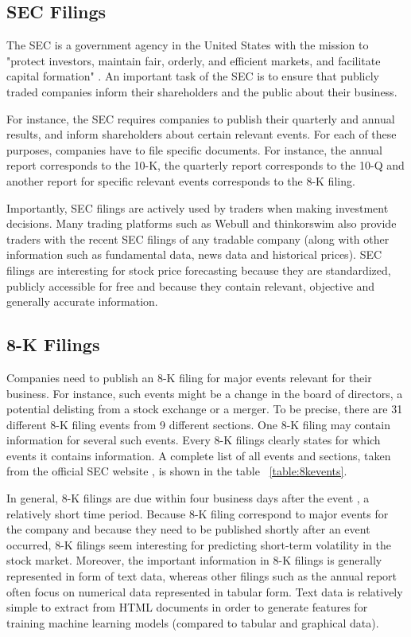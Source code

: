\documentclass{article}
\begin{document}
	\subsection{SEC Filings}
	
	The SEC is a government agency in the United States with the mission to "protect investors, maintain fair, orderly, and efficient markets, and facilitate capital formation" \cite{noauthor_sec.gov_nodate}. An important task of the SEC is to ensure that publicly traded companies inform their shareholders and the public about their business.
	
	For instance, the SEC requires companies to publish their quarterly and annual results, and inform shareholders about certain relevant events. For each of these purposes, companies have to file specific documents. For instance, the annual report corresponds to the 10-K, the quarterly report corresponds to the 10-Q and another report for specific relevant events corresponds to the 8-K filing.
	
	Importantly, SEC filings are actively used by traders when making investment decisions. Many trading platforms such as Webull and thinkorswim also provide traders with the recent SEC filings of any tradable company (along with other information such as fundamental data, news data and historical prices). SEC filings are interesting for stock price forecasting because they are standardized, publicly accessible for free and because they contain relevant, objective and generally accurate information.
	
	
	\subsection{8-K Filings}
	
	Companies need to publish an 8-K filing for major events relevant for their business. For instance, such events might be a change in the board of directors, a potential delisting from a stock exchange or a merger. To be precise, there are 31 different 8-K filing events from 9 different sections. One 8-K filing may contain information for several such events. Every 8-K filings clearly states for which events it contains information. A complete list of all events and sections, taken from the official SEC website \cite{noauthor_sec.gov_nodate-1}, is shown in the table ~\ref{table:8kevents}.
	
	In general, 8-K filings are  due within four business days after the event \cite{kenton_8-k_nodate}, a relatively short time period. Because 8-K filing correspond to major events for the company and because they need to be published shortly after an event occurred, 8-K filings seem interesting for predicting short-term volatility in the stock market. Moreover, the important information in 8-K filings is generally represented in form of text data, whereas other filings such as the annual report often focus on numerical data represented in tabular form. Text data is relatively simple to extract from HTML documents in order to generate features for training machine learning models (compared to tabular and graphical data).
	
\end{document}
